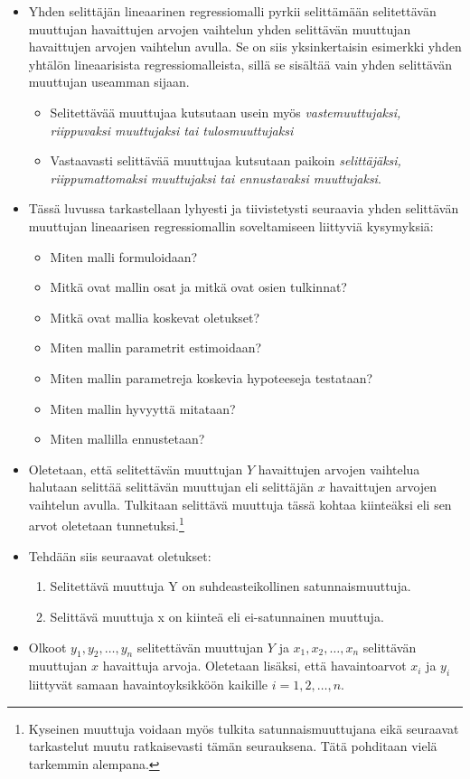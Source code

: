 \documentclass[
]{book}
\providecommand{\tightlist}{%
  \setlength{\itemsep}{0pt}\setlength{\parskip}{0pt}}
\begin{document}
\begin{itemize}
\item
  Yhden selittäjän lineaarinen regressiomalli pyrkii selittämään selitettävän muuttujan havaittujen arvojen vaihtelun yhden selittävän muuttujan havaittujen arvojen vaihtelun avulla. Se on siis yksinkertaisin esimerkki yhden yhtälön lineaarisista regressiomalleista, sillä se sisältää vain yhden selittävän muuttujan useamman sijaan.

  \begin{itemize}
  \tightlist
  \item
    Selitettävää muuttujaa kutsutaan usein myös \emph{vastemuuttujaksi, riippuvaksi muuttujaksi tai tulosmuuttujaksi}
  \item
    Vastaavasti selittävää muuttujaa kutsutaan paikoin \emph{selittäjäksi, riippumattomaksi muuttujaksi tai ennustavaksi muuttujaksi}.
  \end{itemize}
\item
  Tässä luvussa tarkastellaan lyhyesti ja tiivistetysti seuraavia yhden selittävän muuttujan lineaarisen regressiomallin soveltamiseen liittyviä kysymyksiä:

  \begin{itemize}
  \tightlist
  \item
    Miten malli formuloidaan?
  \item
    Mitkä ovat mallin osat ja mitkä ovat osien tulkinnat?
  \item
    Mitkä ovat mallia koskevat oletukset?
  \item
    Miten mallin parametrit estimoidaan?
  \item
    Miten mallin parametreja koskevia hypoteeseja testataan?
  \item
    Miten mallin hyvyyttä mitataan?
  \item
    Miten mallilla ennustetaan?
  \end{itemize}
\item
  Oletetaan, että selitettävän muuttujan \(Y\) havaittujen arvojen vaihtelua halutaan selittää selittävän muuttujan eli selittäjän \(x\) havaittujen arvojen vaihtelun avulla. Tulkitaan selittävä muuttuja tässä kohtaa kiinteäksi eli sen arvot oletetaan tunnetuksi.\footnote{Kyseinen muuttuja voidaan myös tulkita satunnaismuuttujana eikä seuraavat tarkastelut muutu ratkaisevasti tämän seurauksena. Tätä pohditaan vielä tarkemmin alempana.}
\item
  Tehdään siis seuraavat oletukset:

  \begin{enumerate}
  \def\labelenumi{\roman{enumi})}
  \tightlist
  \item
    Selitettävä muuttuja Y on suhdeasteikollinen satunnaismuuttuja.
  \item
    Selittävä muuttuja x on kiinteä eli ei-satunnainen muuttuja.
  \end{enumerate}
\item
  Olkoot \(y_1, y_2,\ldots, y_n\) selitettävän muuttujan \(Y\) ja \(x_1, x_2, \ldots, x_n\) selittävän muuttujan \(x\) havaittuja arvoja. Oletetaan lisäksi, että havaintoarvot \(x_i\) ja \(y_i\) liittyvät
  samaan havaintoyksikköön kaikille \(i=1, 2, \ldots, n\).


\end{itemize}
\end{document}
